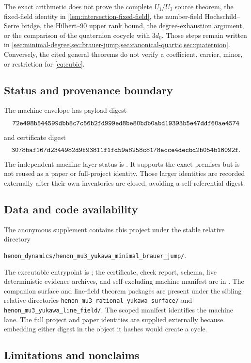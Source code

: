 The exact arithmetic does not prove the complete \(U_1/U_3\) source theorem,
the fixed-field identity in \cref{lem:intersection-fixed-field}, the
number-field Hochschild--Serre bridge, the Hilbert--90 upper rank bound, the
degree-exhaustion argument, or the comparison of the quaternion cocycle with
\(3d_0\).  Those steps remain written in
\cref{sec:minimal-degree,sec:brauer-jump,sec:canonical-quartic,sec:quaternion}.
Conversely, the cited general theorems do not verify a coefficient, carrier,
minor, or restriction for \cref{eq:cubic}.

\subsection{Status and provenance boundary}

The machine envelope has payload digest
\[
\texttt{72e498b544599dbb8c7c56b2fd999ed8be80bdb0abd19393b5e47ddf60ae4574}
\]
and certificate digest
\[
\texttt{3078baf167d2344982d9f93811f1fd59a8258c8178ecce4decbd2b054b16092f}.
\]
The independent machine-layer status is
.  It supports the exact premises but is
not reused as a paper or full-project identity.  Those larger identities are
recorded externally after their own inventories are closed, avoiding a
self-referential digest.

\subsection{Data and code availability}

The anonymous supplement contains this project under the stable relative
directory
\begin{center}
\nolinkurl{henon_dynamics/henon_mu3_yukawa_minimal_brauer_jump/}.
\end{center}
The executable entrypoint is ; the certificate, check
report, schema, five deterministic evidence archives, and self-excluding
machine manifest are in .  The companion surface and line-field
theorem packages are present under the sibling relative directories
\nolinkurl{henon_mu3_rational_yukawa_surface/} and
\nolinkurl{henon_mu3_yukawa_line_field/}.  The scoped manifest identifies the
machine lane.  The full project and paper identities are supplied externally
because embedding either digest in the object it hashes would create a cycle.

\subsection{Limitations and nonclaims}

